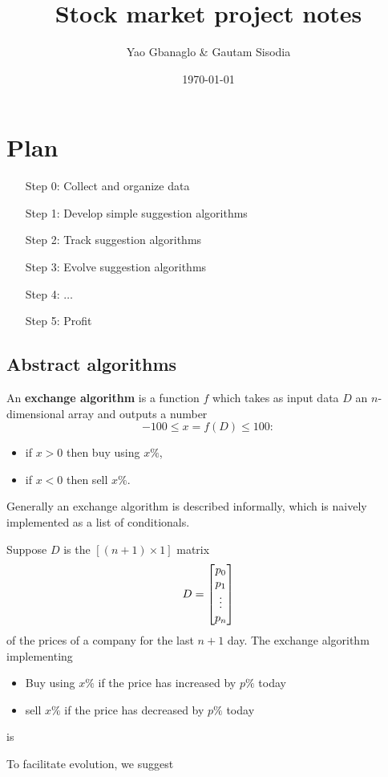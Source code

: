 \documentclass[11pt]{amsart}
\begin{document}
\title{Stock market project notes}
\date{\today}
\author{Yao Gbanaglo \& Gautam Sisodia} 
\address{}
\email{}
\maketitle


\section{Plan}

\begin{enumerate}
\item[Step 0:] Collect and organize data
\item[Step 1:] Develop simple suggestion algorithms 
\item[Step 2:] Track suggestion algorithms
\item[Step 3:] Evolve suggestion algorithms
\item[Step 4:] $\ldots$
\item[Step 5:] Profit
\end{enumerate}

\subsection{Abstract algorithms}

An {\bf exchange algorithm} is a function $f$ which takes as input data $D$ an $n$-dimensional array and outputs a number 
$$
-100 \leq x = f(D)\leq 100:
$$
\begin{itemize}
\item if $x > 0$ then buy using $x \%$, 
\item if $x < 0$ then sell $x \%$.
\end{itemize}

Generally an exchange algorithm is described informally, which is naively implemented as a list of conditionals.

\begin{ex}

Suppose $D$ is the $[(n + 1) \times 1]$ matrix
$$
D = \left[\begin{matrix} p_0 \\ p_1 \\ \vdots \\ p_n \end{matrix}\right]
$$
of the prices of a company for the last $n + 1$ day. The exchange algorithm implementing
\begin{itemize}
\item Buy using $x\%$ if the price has increased by $p \%$ today 
\item sell $x \%$ if the price has decreased by $p \%$ today 
\end{itemize}
is

\end{ex}

\begin{ex}
\end{ex}

\begin{ques}	
\end{ques}




To facilitate evolution, we suggest 
 
\end{document}
